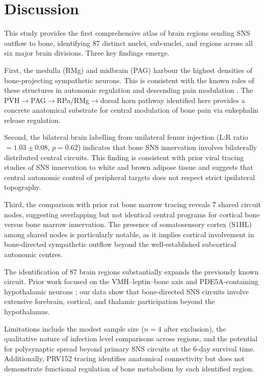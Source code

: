 \documentclass[11pt]{article}
\begin{document}
\section{Discussion}

This study provides the first comprehensive atlas of brain regions sending SNS outflow to bone, identifying 87 distinct nuclei, sub-nuclei, and regions across all six major brain divisions. Three key findings emerge.

First, the medulla (RMg) and midbrain (PAG) harbour the highest densities of bone-projecting sympathetic neurons. This is consistent with the known roles of these structures in autonomic regulation and descending pain modulation \citep{saper2002central, shi2020bone}. The PVH$\to$PAG$\to$RPa/RMg$\to$dorsal horn pathway identified here provides a concrete anatomical substrate for central modulation of bone pain via enkephalin release regulation.

Second, the bilateral brain labelling from unilateral femur injection (L:R ratio $= 1.03 \pm 0.08$, $p = 0.62$) indicates that bone SNS innervation involves bilaterally distributed central circuits. This finding is consistent with prior viral tracing studies of SNS innervation to white and brown adipose tissue \citep{bartness2014sns, song2005tracing} and suggests that central autonomic control of peripheral targets does not respect strict ipsilateral topography.

Third, the comparison with prior rat bone marrow tracing reveals 7 shared circuit nodes, suggesting overlapping but not identical central programs for cortical bone versus bone marrow innervation. The presence of somatosensory cortex (S1HL) among shared nodes is particularly notable, as it implies cortical involvement in bone-directed sympathetic outflow beyond the well-established subcortical autonomic centres.

The identification of 87 brain regions substantially expands the previously known circuit. Prior work focused on the VMH--leptin--bone axis \citep{takeda2002leptin, ducy2000leptin} and PDE5A-containing hypothalamic neurons \citep{schiller2021central}; our data show that bone-directed SNS circuits involve extensive forebrain, cortical, and thalamic participation beyond the hypothalamus.

Limitations include the modest sample size ($n = 4$ after exclusion), the qualitative nature of infection level comparisons across regions, and the potential for polysynaptic spread beyond primary SNS circuits at the 6-day survival time. Additionally, PRV152 tracing identifies anatomical connectivity but does not demonstrate functional regulation of bone metabolism by each identified region.
\end{document}
